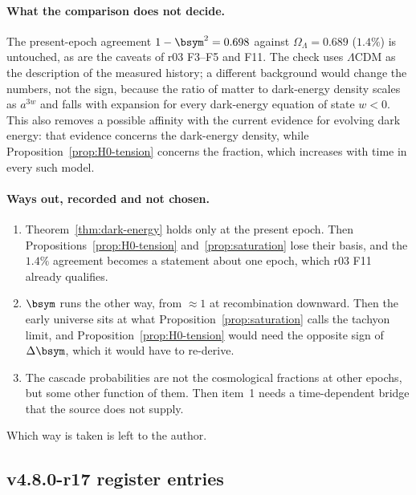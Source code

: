 \paragraph{What the comparison does not decide.}
The present-epoch agreement \(1-\bsym^2=0.698\) against \(\Omega_\Lambda=0.689\) (\(1.4\%\)) is untouched, as are
the caveats of r03 F3--F5 and F11.  The check uses \(\Lambda\)CDM as the description of the measured history; a
different background would change the numbers, not the sign, because the ratio of matter to dark-energy density
scales as \(a^{3w}\) and falls with expansion for every dark-energy equation of state \(w<0\).  This also removes a possible affinity with the
current evidence for evolving dark energy: that evidence concerns the dark-energy density, while
Proposition~\ref{prop:H0-tension} concerns the fraction, which increases with time in every such model.

\paragraph{Ways out, recorded and not chosen.}
\begin{enumerate}[leftmargin=2em]
\item[(a)] Theorem~\ref{thm:dark-energy} holds only at the present epoch.  Then
Propositions~\ref{prop:H0-tension} and~\ref{prop:saturation} lose their basis, and the \(1.4\%\) agreement becomes
a statement about one epoch, which r03 F11 already qualifies.
\item[(b)] \(\bsym\) runs the other way, from \(\approx1\) at recombination downward.  Then the early universe sits at
what Proposition~\ref{prop:saturation} calls the tachyon limit, and Proposition~\ref{prop:H0-tension} would need the
opposite sign of \(\Delta\bsym\), which it would have to re-derive.
\item[(c)] The cascade probabilities are not the cosmological fractions at other epochs, but some other function of
them.  Then item~1 needs a time-dependent bridge that the source does not supply.
\end{enumerate}
Which way is taken is left to the author.

\subsection*{v4.8.0-r17 register entries}
\label{subsec:v480-r17-register}

